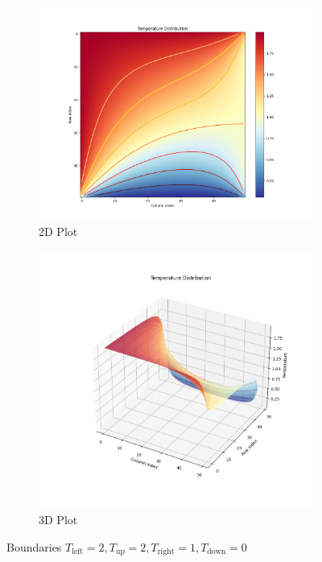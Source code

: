 \documentclass{article}
\begin{document}
\begin{figure}[H]
  \begin{subfigure}{0.45\textwidth}
    \includegraphics[width=\linewidth]{figures/Figure_1.png}
    \caption{2D Plot}
  \end{subfigure}
  \hfill
  \begin{subfigure}{0.45\textwidth}
    \includegraphics[width=\linewidth]{figures/Figure_2.png}
    \caption{3D Plot}
  \end{subfigure}
  \caption{Boundaries $T_{\text{left}}=2, T_{\text{up}}=2, T_{\text{right}}=1, T_{\text{down}}=0$}
\end{figure}
\end{document}
